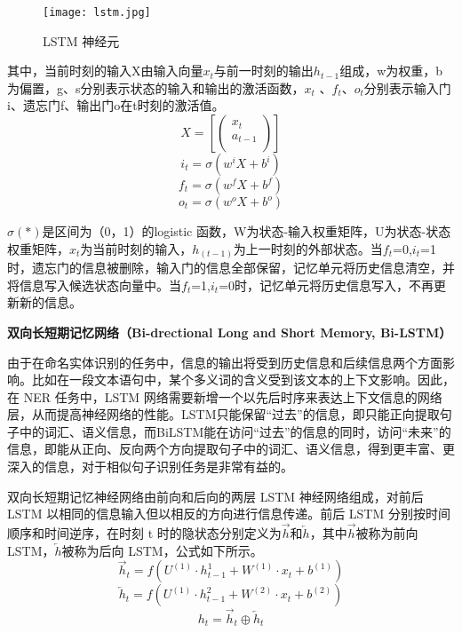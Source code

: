 \documentclass[letterpaper]{article}
\begin{document}
    \begin{figure}[h]
      \centering
      \texttt{[image: lstm.jpg]}
      \caption{LSTM 神经元}
    \end{figure}

    其中，当前时刻的输入X由输入向量$x_t$与前一时刻的输出$h_{t-1}$组成，w为权重，b为偏置，g、s分别表示状态的输入和输出的激活函数，$x_t$ 、$f_t$、$o_t$分别表示输入门i、遗忘门f、输出门o在t时刻的激活值。
    $$
    X=\left[ \left( \begin{array}{c}
      x_t\\
      a_{t-1}\\
    \end{array} \right) \right] 
    $$
    $$
    i_t=\sigma \left( w^iX+b^i \right) 
    $$
    $$
    f_t=\sigma \left( w^fX+b^f \right) 
    $$
    $$
    o_t=\sigma \left( w^oX+b^o \right) 
    $$

    $\sigma(*)$是区间为（0，1）的logistic 函数，W为状态-输入权重矩阵，U为状态-状态权重矩阵，$x_t$为当前时刻的输入，$h_(t-1)$为上一时刻的外部状态。当$f_t$=0,$i_t$=1时，遗忘门的信息被删除，输入门的信息全部保留，记忆单元将历史信息清空，并将信息写入候选状态向量中。当$f_t$=1,$i_t$=0时，记忆单元将历史信息写入，不再更新新的信息。

    \newpage
    \textbf{双向长短期记忆网络（Bi-drectional Long and Short Memory, Bi-LSTM）}
    
    由于在命名实体识别的任务中，信息的输出将受到历史信息和后续信息两个方面影响。比如在一段文本语句中，某个多义词的含义受到该文本的上下文影响。因此，在 NER 任务中，LSTM 网络需要新增一个以先后时序来表达上下文信息的网络层，从而提高神经网络的性能。LSTM只能保留“过去”的信息，即只能正向提取句子中的词汇、语义信息，而BiLSTM能在访问“过去”的信息的同时，访问“未来”的信息，即能从正向、反向两个方向提取句子中的词汇、语义信息，得到更丰富、更深入的信息，对于相似句子识别任务是非常有益的。
    
    双向长短期记忆神经网络由前向和后向的两层 LSTM 神经网络组成，对前后 LSTM 以相同的信息输入但以相反的方向进行信息传递。前后 LSTM 分别按时间顺序和时间逆序，在时刻 t 时的隐状态分别定义为$\overrightarrow{h}$和$\overleftarrow{h}$，其中$\overrightarrow{h}$被称为前向 LSTM，$\overleftarrow{h}$被称为后向 LSTM，公式如下所示。
    $$
    \overrightarrow{h}_t=f\left( U^{\left( 1 \right)}\cdot h_{t-1}^{1}+W^{\left( 1 \right)}\cdot x_t+b^{\left( 1 \right)} \right) 
    $$
    $$
    \overleftarrow{h}_t=f\left( U^{\left( 1 \right)}\cdot h_{t-1}^{2}+W^{\left( 2 \right)}\cdot x_t+b^{\left( 2 \right)} \right) 
    $$
    $$
    h_t=\overrightarrow{h}_t\oplus \overleftarrow{h}_t
    $$
\end{document}
